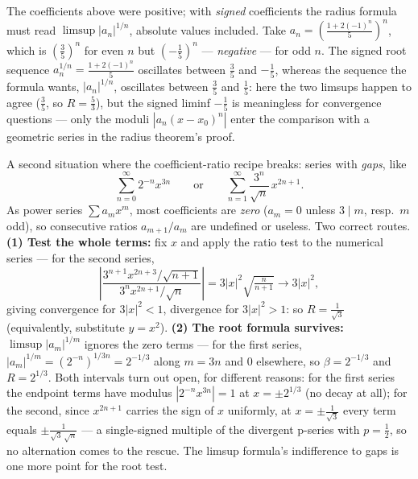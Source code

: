 \documentclass[11pt]{report}
\begin{document}
\begin{rembox}
The coefficients above were positive; with \emph{signed} coefficients the radius formula must read $\limsup |a_n|^{1/n}$, absolute values included. Take $a_n = \left( \tfrac{1 + 2(-1)^n}{5} \right)^n$, which is $\left(\tfrac35\right)^n$ for even $n$ but $\left(-\tfrac15\right)^n$ --- \emph{negative} --- for odd $n$. The signed root sequence $a_n^{1/n} = \tfrac{1+2(-1)^n}{5}$ oscillates between $\tfrac35$ and $-\tfrac15$, whereas the sequence the formula wants, $|a_n|^{1/n}$, oscillates between $\tfrac35$ and $\tfrac15$: here the two limsups happen to agree ($\tfrac35$, so $R = \tfrac53$), but the signed liminf $-\tfrac15$ is meaningless for convergence questions --- only the moduli $|a_n(x-x_0)^n|$ enter the comparison with a geometric series in the radius theorem's proof.
\end{rembox}

\begin{rembox}
A second situation where the coefficient-ratio recipe breaks: series with \emph{gaps}, like
\[
\sum_{n=0}^\infty 2^{-n} x^{3n} \qquad \text{or} \qquad \sum_{n=1}^\infty \frac{3^n}{\sqrt n}\, x^{2n+1}.
\]
As power series $\sum a_m x^m$, most coefficients are \emph{zero} ($a_m = 0$ unless $3 \mid m$, resp.\ $m$ odd), so consecutive ratios $a_{m+1}/a_m$ are undefined or useless. Two correct routes. \textbf{(1) Test the whole terms:} fix $x$ and apply the ratio test to the numerical series --- for the second series,
\[
\left| \frac{3^{n+1} x^{2n+3} / \sqrt{n+1}}{3^{n} x^{2n+1} / \sqrt{n}} \right| = 3|x|^2 \sqrt{\tfrac{n}{n+1}} \longrightarrow 3|x|^2,
\]
giving convergence for $3|x|^2 < 1$, divergence for $3|x|^2 > 1$: so $R = \tfrac{1}{\sqrt3}$ (equivalently, substitute $y = x^2$). \textbf{(2) The root formula survives:} $\limsup |a_m|^{1/m}$ ignores the zero terms --- for the first series, $|a_m|^{1/m} = (2^{-n})^{1/3n} = 2^{-1/3}$ along $m = 3n$ and $0$ elsewhere, so $\beta = 2^{-1/3}$ and $R = 2^{1/3}$. Both intervals turn out open, for different reasons: for the first series the endpoint terms have modulus $|2^{-n} x^{3n}| = 1$ at $x = \pm 2^{1/3}$ (no decay at all); for the second, since $x^{2n+1}$ carries the sign of $x$ uniformly, at $x = \pm\tfrac{1}{\sqrt3}$ every term equals $\pm\tfrac{1}{\sqrt3\,\sqrt n}$ --- a single-signed multiple of the divergent p-series with $p = \tfrac12$, so no alternation comes to the rescue. The limsup formula's indifference to gaps is one more point for the root test.
\end{rembox}
\end{document}
